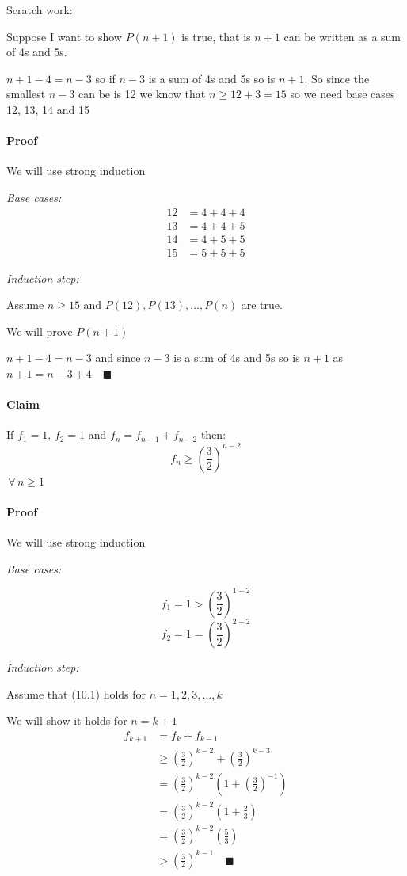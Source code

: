 \documentclass{article}
\newcommand{\A}{\,\forall\,}
\begin{document}
\begin{itshape}
Scratch work:

Suppose I want to show \(P(n+1)\) is true, that is \(n+1\) can be written as a sum of 4s and 5s.

\(n+1-4=n-3\) so if \(n-3\) is a sum of 4s and 5s so is \(n+1\). So since the smallest \(n-3\) can be is 12 we know that \(n\ge 12+3=15\) so we need base cases 12, 13, 14 and 15
\end{itshape}

\paragraph{Proof} We will use strong induction

\emph{Base cases:}
\begin{align*}
12&=4+4+4\\
13&=4+4+5\\
14&=4+5+5\\
15&=5+5+5
\end{align*}

\emph{Induction step:}

Assume \(n\ge15\) and \(P(12),P(13),\dotsc,P(n)\) are true.

We will prove \(P(n+1)\)

\(n+1-4=n-3\) and since \(n-3\) is a sum of 4s and 5s so is \(n+1\) as \(n+1=n-3+4\quad\blacksquare\)

\paragraph{Claim} If \(f_1=1,\,f_2=1\) and \(f_n=f_{n-1}+f_{n-2}\) then:
\[f_n\ge\left(\frac32\right)^{n-2}\tag{10.1}\]
\(\A n\ge 1\)

\paragraph{Proof} We will use strong induction

\emph{Base cases:}

\[f_1=1>\left(\frac 32\right)^{1-2}\]
\[f_2=1=\left(\frac 32\right)^{2-2}\]

\emph{Induction step:}

Assume that (10.1) holds for \(n=1,2,3,\dotsc,k\)

We will show it holds for \(n=k+1\)
\begin{align*}
f_{k+1}&=f_k+f_{k-1}\\
&\ge\left(\frac 32\right)^{k-2}+\left(\frac 32\right)^{k-3}\\
&=\left(\frac 32\right)^{k-2}\left(1+\left(\frac 32\right)^{-1}\right)\\
&=\left(\frac 32\right)^{k-2}\left(1+\frac 23\right)\\
&=\left(\frac 32\right)^{k-2}\left(\frac 53\right)\\
&>\left(\frac 32\right)^{k-1}\quad\blacksquare
\end{align*}
\end{document}
